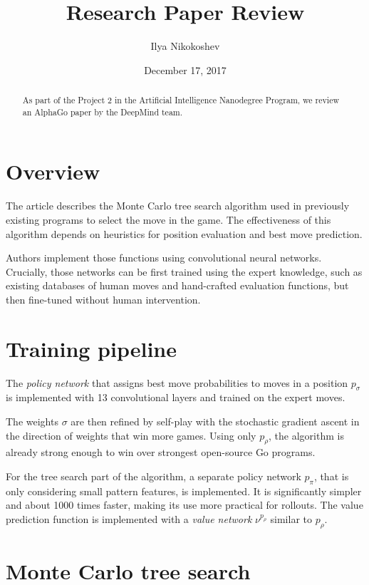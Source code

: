 \documentclass[oneside]{article}   	%
\title{Research Paper Review}
\author{Ilya Nikokoshev}
\date{December 17, 2017}
\begin{document}
\maketitle

\begin{abstract}
As part of the Project 2 in the Artificial Intelligence Nanodegree Program, we review an AlphaGo paper \cite{Silver_2016} by the DeepMind team.
\end{abstract}


\section{Overview}

The article describes the Monte Carlo tree search algorithm used in previously existing programs to select the move in the game. The effectiveness of this algorithm depends on heuristics for position evaluation and best move prediction.

Authors implement those functions using convolutional neural networks. Crucially, those networks can be first trained using the expert knowledge, such as existing databases of human moves and hand-crafted evaluation functions, but then fine-tuned without human intervention.


\section{Training pipeline}

The {\it policy network} that assigns best move probabilities to moves in a position $p_\sigma$ is implemented with 13 convolutional layers and trained on the expert moves.

The weights $\sigma$ are then refined by self-play with the stochastic gradient ascent in the direction of weights that win more games. Using only $p_\rho$, the algorithm is already strong enough to win over strongest open-source Go programs. 

For the tree search part of the algorithm, a separate policy network $p_\pi$, that is only considering small pattern features, is implemented. It is significantly simpler and about 1000 times faster, making its use more practical for rollouts. The value prediction function is implemented with a {\it value network} $\nu^{p_\rho}$ similar to $p_\rho$.


\section{Monte Carlo tree search}
\end{document}
